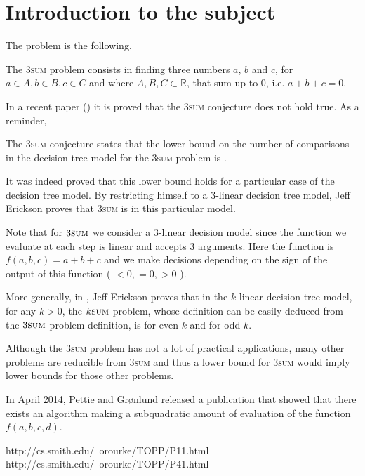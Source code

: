 \section{Introduction to the subject}

The problem is the following,

\begin{problem}
The 3\textsc{sum} problem consists in finding three numbers $a$, $b$ and $c$, for
$a \in A, b \in B, c \in C$ and where $A, B, C \subset \mathbb{R}$, that sum
up to $0$, i.e. $a + b + c = 0$.
\end{problem}

In a recent paper (\cite{DBLP:journals/corr/JorgensenP14}) it is proved that
the 3\textsc{sum} conjecture does not hold true. As a reminder,

\begin{conjecture}
The 3\textsc{sum} conjecture states that the lower bound on the number of
comparisons in the decision tree model for the 3\textsc{sum} problem
is .
\end{conjecture}

It was indeed proved that this lower bound holds for a particular case of the
decision tree model. By restricting himself to a $3$-linear decision tree model,
Jeff Erickson proves that 3\textsc{sum} is  in this particular
model.

Note that for $3\textsc{sum}$ we consider a $3$-linear decision model
since the function we evaluate at each step is linear and accepts 3 arguments.
Here the function is $f(a, b, c) = a + b + c$ and we make decisions depending on
the sign of the output of this function ( $<0, =0, >0$ ).

More generally, in \cite{cj99-08}, Jeff Erickson proves that in the $k$-linear
decision tree model, for any $k > 0$, the $k\textsc{sum}$ problem,
whose definition can be easily deduced from the $3\textsc{sum}$ problem
definition, is  for even $k$ and
 for odd $k$.

Although the 3\textsc{sum} problem has not a lot of practical applications, many
other problems are reducible from 3\textsc{sum} and thus a lower bound for
3\textsc{sum} would imply lower bounds for those other problems.

In April 2014, Pettie and Grønlund released a publication that showed that there
exists an algorithm making a subquadratic amount of evaluation of the function
$f(a, b, c, d)$.

http://cs.smith.edu/~orourke/TOPP/P11.html
http://cs.smith.edu/~orourke/TOPP/P41.html
